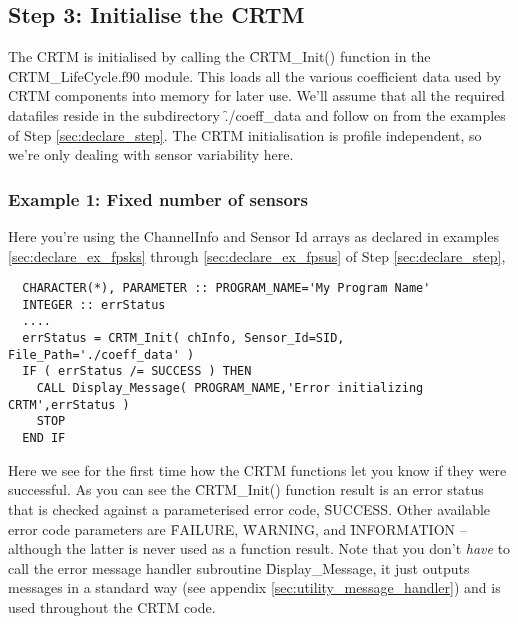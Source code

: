 \subsection{Step 3: Initialise the CRTM}
The CRTM is initialised by calling the \f{CRTM\_Init()} function in the \f{CRTM\_LifeCycle.f90} module. This loads all the various coefficient data used by CRTM components into memory for later use. We'll assume that all the required datafiles reside in the subdirectory \f{./coeff\_data} and follow on from the examples of Step \ref{sec:declare_step}. The CRTM initialisation is profile independent, so we're only dealing with sensor variability here.

\subsubsection{Example 1: Fixed number of sensors}
Here you're using the ChannelInfo and Sensor Id arrays as declared in examples \ref{sec:declare_ex_fpsks} through \ref{sec:declare_ex_fpsus} of Step \ref{sec:declare_step},
\begin{ttfamily}
  \begin{verbatim}
  CHARACTER(*), PARAMETER :: PROGRAM_NAME='My Program Name'
  INTEGER :: errStatus
  ....
  errStatus = CRTM_Init( chInfo, Sensor_Id=SID, File_Path='./coeff_data' )
  IF ( errStatus /= SUCCESS ) THEN 
    CALL Display_Message( PROGRAM_NAME,'Error initializing CRTM',errStatus )
    STOP
  END IF\end{verbatim}
\end{ttfamily}
Here we see for the first time how the CRTM functions let you know if they were successful. As you can see the \f{CRTM\_Init()} function result is an error status that is checked against a parameterised error code, \f{SUCCESS}. Other available error code parameters are \f{FAILURE}, \f{WARNING}, and \f{INFORMATION} -- although the latter is never used as a function result. Note that you don't \textit{have} to call the error message handler subroutine \f{Display\_Message}, it just outputs messages in a standard way (see appendix \ref{sec:utility_message_handler}) and is used throughout the CRTM code.


